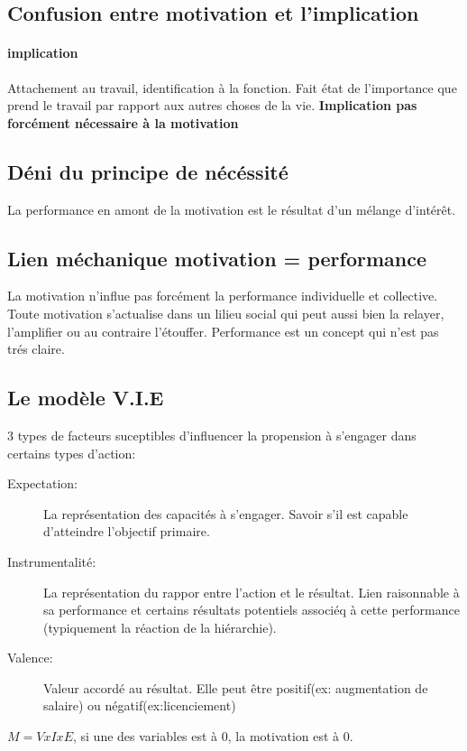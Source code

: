 \documentclass[11pt]{article} %
\begin{document}
	\subsection{Confusion entre motivation et l'implication}
		\paragraph{implication} Attachement au travail, identification à la fonction. Fait état de l'importance
		que prend le travail par rapport aux autres choses de la vie. \textbf{Implication pas forcément 
		nécessaire à la motivation}
	\subsection{Déni du principe de nécéssité}
		La performance en amont de la motivation est le résultat d'un mélange d'intérêt.
	\subsection{Lien méchanique motivation = performance}
		La motivation n'influe pas forcément la performance individuelle et collective. Toute motivation 
		s'actualise dans un lilieu social qui peut aussi bien la relayer, l'amplifier ou au contraire l'étouffer. 
		Performance est un concept qui n'est pas trés claire.
	\subsection{Le modèle V.I.E}
		3 types de facteurs suceptibles d'influencer la propension à s'engager dans certains types d'action:
		\begin{description}
			\item[Expectation: ] La représentation des capacités à s'engager. Savoir s'il est capable d'atteindre 
			l'objectif primaire. 
			\item[Instrumentalité: ] La représentation du rappor entre l'action et le résultat. Lien raisonnable 
			à sa performance et certains résultats potentiels associéq à cette performance (typiquement la 
			réaction de la hiérarchie).
			\item[Valence: ] Valeur accordé au résultat. Elle peut être positif(ex: augmentation de salaire) ou
			négatif(ex:licenciement)
		\end{description}
		$M=VxIxE$, si une des variables est à 0, la motivation est à 0. 
\end{document}
